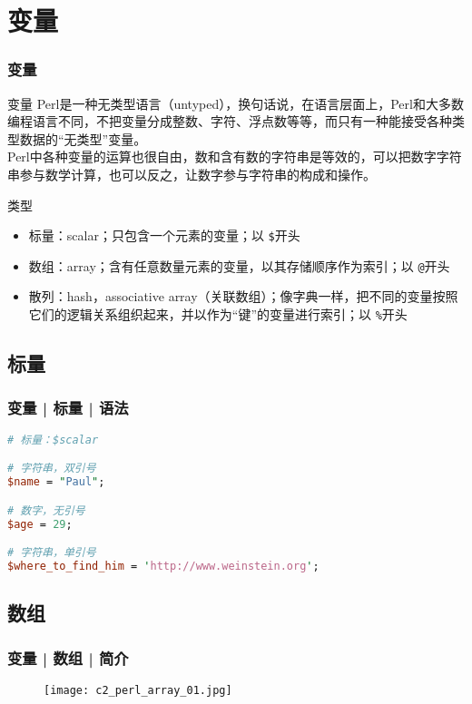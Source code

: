 \section{变量}
\begin{frame}[fragile]
  \frametitle{变量}
  \begin{block}{变量}
    Perl是一种无类型语言（untyped），换句话说，在语言层面上，Perl和大多数编程语言不同，不把变量分成整数、字符、浮点数等等，而只有一种能接受各种类型数据的“无类型”变量。\\
    Perl中各种变量的运算也很自由，数和含有数的字符串是等效的，可以把数字字符串参与数学计算，也可以反之，让数字参与字符串的构成和操作。
  \end{block}
  \pause
  \begin{block}{\alert{类型}}
    \begin{itemize}
      \item 标量：scalar；只包含一个元素的变量；以 \verb|$|开头
      \item 数组：array；含有任意数量元素的变量，以其存储顺序作为索引；以 \verb|@|开头
      \item 散列：hash，associative array（关联数组）；像字典一样，把不同的变量按照它们的逻辑关系组织起来，并以作为“键”的变量进行索引；以 \verb|%|开头
    \end{itemize}
  \end{block}
\end{frame}

\subsection{标量}
\begin{frame}[fragile]
  \frametitle{变量 | 标量 | \alert{语法}}
\begin{lstlisting}[language=Perl]
# 标量：$scalar

# 字符串，双引号
$name = "Paul";

# 数字，无引号
$age = 29;

# 字符串，单引号
$where_to_find_him = 'http://www.weinstein.org';
\end{lstlisting}
\end{frame}

\subsection{数组}
\begin{frame}
  \frametitle{变量 | 数组 | 简介}
  \begin{figure}
    \centering
    \texttt{[image: c2\_perl\_array\_01.jpg]}
  \end{figure}
\end{frame}

